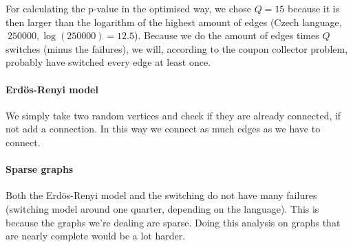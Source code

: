 \documentclass[paper=a4, fontsize=11pt]{scrartcl} %
\begin{document}
For calculating the p-value in the optimised way, we chose $Q=15$ because it is then larger than the logarithm of the highest amount of edges (Czech language, $~250000, \log{(250000)}=12.5$). Because we do the amount of edges times $Q$ switches (minus the failures), we will, according to the coupon collector problem, probably have switched every edge at least once.

\paragraph{Erdös-Renyi model}
We simply take two random vertices and check if they are already connected, if not add a connection. In this way we connect as much edges as we have to connect.

\paragraph{Sparse graphs}
Both the Erdös-Renyi model and the switching do not have many failures (switching model around one quarter, depending on the language). This is because the graphs we're dealing are sparse. Doing this analysis on graphs that are nearly complete would be a lot harder.
\end{document}
